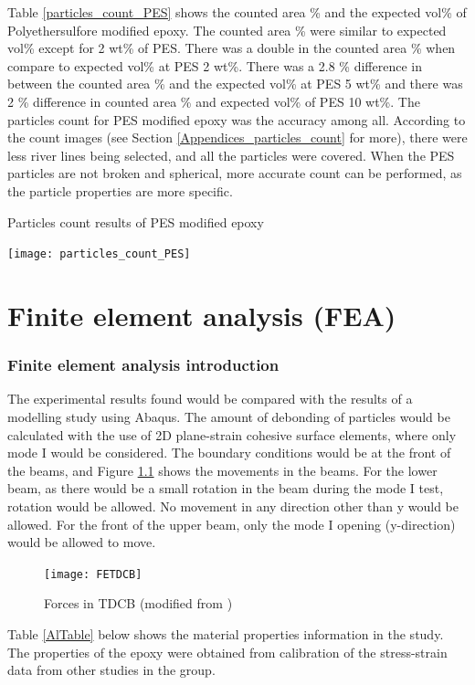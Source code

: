 \documentclass[numbers=noendperiod,chapterprefix=on]{icldt} %
\begin{document}
Table \ref{particles_count_PES} shows the counted area \% and the expected vol\% of Polyethersulfore modified epoxy. 
The counted area \% were similar to expected vol\% except for 2 wt\% of PES. 
There was a double in the counted area \% when compare to expected vol\% at PES 2 wt\%. There was a 2.8 \% difference in between the counted area \% and the expected vol\% at PES 5 wt\% and there was 2 \% difference in counted area \% and expected vol\% of PES 10 wt\%.
The particles count for PES modified epoxy was the accuracy among all. According to the count images (see Section  \ref{Appendices_particles_count} for more), there were less river lines being selected, and all the particles were covered. 
When the PES particles are not broken and spherical, more accurate count can be performed, as the particle properties are more specific. 

\begin{table}[!htpb]
\centering
\caption{Particles count results of PES modified epoxy} \label{particles_count_PES}
\texttt{[image: particles\_count\_PES]}
\end{table}
\FloatBarrier

\chapter{Finite element analysis (FEA)} \label{FE_intro}
\subsection{Finite element analysis introduction}
The experimental results found would be compared with the results of a modelling study using Abaqus. The amount of debonding of particles would be calculated with the use of 2D plane-strain cohesive surface elements, where only mode I would be considered. The boundary conditions would be at the front of the beams, and Figure \ref{FETDCB} shows the movements in the beams. For the lower beam, as there would be a small rotation in the beam during the mode I test, rotation would be allowed. No movement in any direction other than y would be allowed. For the front of the upper beam, only the mode I opening (y-direction) would be allowed to move. 

\begin{figure}[!htpb]
\centering
\texttt{[image: FETDCB]}
\caption{Forces in TDCB (modified from \cite{Brett2011})}\label{FETDCB}
\end{figure}
\FloatBarrier

Table \ref{AlTable} below shows the material properties information in the study. The properties of the epoxy were obtained from calibration of the stress-strain data from other studies in the group.
\end{document}
